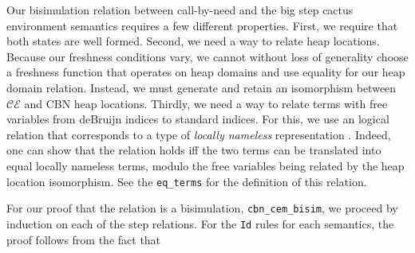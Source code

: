 Our bisimulation relation between call-by-need and the big step cactus
environment semantics requires a few different properties. First, we require
that both states are well formed. Second, we need a way to relate heap
locations. Because our freshness conditions vary, we cannot without loss of
generality choose a freshness function that operates on heap domains and use
equality for our heap domain relation. Instead, we must generate and retain an
isomorphism between $\mathcal{CE}$ and CBN heap locations. Thirdly, we need a
way to relate terms with free variables from deBruijn indices to standard
indices. For this, we use an logical relation that corresponds to a type of
\emph{locally nameless} representation \cite{?}. Indeed, one can show that the
relation holds iff the two terms can be translated into equal locally nameless
terms, modulo the free variables being related by the heap location isomorphism.  
See the \texttt{eq\_terms} for the definition of this relation.

For our proof that the relation is a bisimulation, \texttt{cbn\_cem\_bisim}, we
proceed by induction on each of the step relations.  For the \texttt{Id} rules
for each semantics, the proof follows from the fact that   


